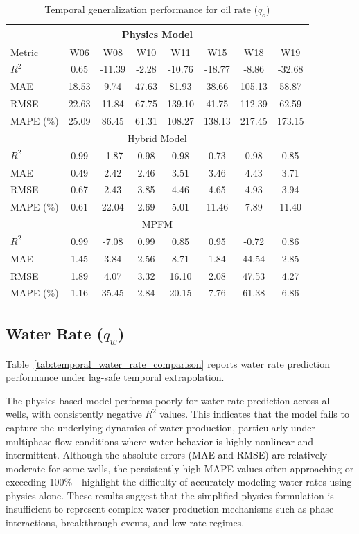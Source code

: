 \documentclass[12pt,APA]{uomthesis}
\begin{document}
\begin{table}[!ht]
\centering
\caption{Temporal generalization performance for oil rate ($q_o$)}
\label{tab:temporal_oil_rate_comparison}
\begin{tabular}{lccccccc}
\hline
\hline
\multicolumn{8}{c}{Physics Model} \\
\hline
Metric & W06 & W08 & W10 & W11 & W15 & W18 & W19 \\
\hline
$R^2$ & 0.65 & -11.39 & -2.28 & -10.76 & -18.77 & -8.86 & -32.68 \\
MAE & 18.53 & 9.74 & 47.63 & 81.93 & 38.66 & 105.13 & 58.87 \\
RMSE & 22.63 & 11.84 & 67.75 & 139.10 & 41.75 & 112.39 & 62.59 \\
MAPE (\%) & 25.09 & 86.45 & 61.31 & 108.27 & 138.13 & 217.45 & 173.15 \\
\hline
\multicolumn{8}{c}{Hybrid Model} \\
\hline
$R^2$ & 0.99 & -1.87 & 0.98 & 0.98 & 0.73 & 0.98 & 0.85 \\
MAE & 0.49 & 2.42 & 2.46 & 3.51 & 3.46 & 4.43 & 3.71 \\
RMSE & 0.67 & 2.43 & 3.85 & 4.46 & 4.65 & 4.93 & 3.94 \\
MAPE (\%) & 0.61 & 22.04 & 2.69 & 5.01 & 11.46 & 7.89 & 11.40 \\
\hline
\multicolumn{8}{c}{MPFM} \\
\hline
$R^2$ & 0.99 & -7.08 & 0.99 & 0.85 & 0.95 & -0.72 & 0.86 \\
MAE & 1.45 & 3.84 & 2.56 & 8.71 & 1.84 & 44.54 & 2.85 \\
RMSE & 1.89 & 4.07 & 3.32 & 16.10 & 2.08 & 47.53 & 4.27 \\
MAPE (\%) & 1.16 & 35.45 & 2.84 & 20.15 & 7.76 & 61.38 & 6.86 \\
\hline
\end{tabular}
\end{table}

\subsection{Water Rate ($q_w$)}
Table~\ref{tab:temporal_water_rate_comparison} reports water rate prediction performance under lag-safe temporal extrapolation.

The physics-based model performs poorly for water rate prediction across all wells, with consistently negative $R^2$ values. This indicates that the model fails to capture the underlying dynamics of water production, particularly under multiphase flow conditions where water behavior is highly nonlinear and intermittent. Although the absolute errors (MAE and RMSE) are relatively moderate for some wells, the persistently high MAPE values often approaching or exceeding 100\% - highlight the difficulty of accurately modeling water rates using physics alone. These results suggest that the simplified physics formulation is insufficient to represent complex water production mechanisms such as phase interactions, breakthrough events, and low-rate regimes.
\end{document}
